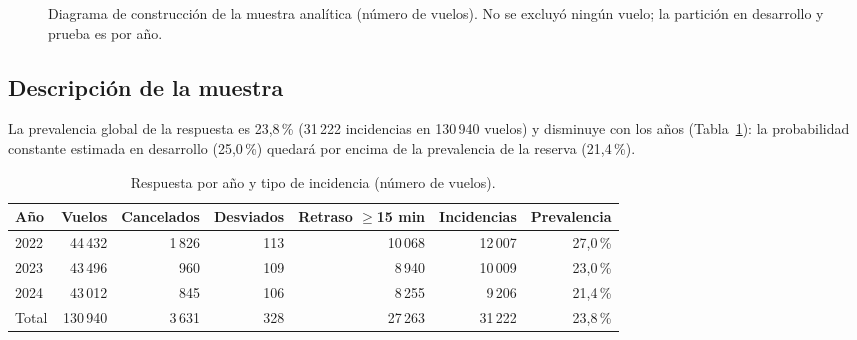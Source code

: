 \documentclass[11pt,a4paper]{article}
\begin{document}
\begin{figure}[ht]
\centering
{}
\caption{Diagrama de construcción de la muestra analítica (número de vuelos). No se excluyó ningún vuelo; la partición en desarrollo y prueba es por año.}
\label{fig:muestra}
\end{figure}
 
\subsection{Descripción de la muestra}
La prevalencia global de la respuesta es 23,8\,\% (31\,222 incidencias en 130\,940 vuelos) y disminuye con los años (Tabla~\ref{tab:respuesta}): la probabilidad constante estimada en desarrollo (25,0\,\%) quedará por encima de la prevalencia de la reserva (21,4\,\%).
 
\begin{table}[ht]
\centering
\caption{Respuesta por año y tipo de incidencia (número de vuelos).}
\label{tab:respuesta}
\small
\begin{tabularx}{\textwidth}{@{}Xrrrrrr@{}}
\toprule
Año & Vuelos & Cancelados & Desviados & Retraso $\geq$15 min & Incidencias & Prevalencia \\
\midrule
2022 & 44\,432 & 1\,826 & 113 & 10\,068 & 12\,007 & 27,0\,\% \\
2023 & 43\,496 & 960 & 109 & 8\,940 & 10\,009 & 23,0\,\% \\
2024 & 43\,012 & 845 & 106 & 8\,255 & 9\,206 & 21,4\,\% \\
\midrule
Total & 130\,940 & 3\,631 & 328 & 27\,263 & 31\,222 & 23,8\,\% \\
\bottomrule
\end{tabularx}
\end{table}
 
\end{document}
